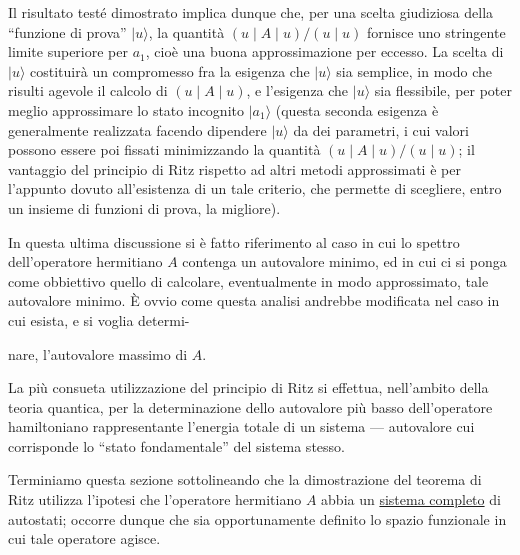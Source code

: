\documentclass[11pt, a4paper]{book}
\numberwithin{equation}{section}
\begin{document}
Il risultato testé dimostrato implica dunque che, per una scelta
giudiziosa della ``funzione di prova'' $|u\rangle$, la quantità $(u \mid A \mid u)/(u \mid u)$
fornisce uno stringente limite superiore per $a_1$, cioè una buona approssimazione per eccesso. La scelta di $|u\rangle$ costituirà un compromesso
fra la esigenza che $|u\rangle$ sia semplice, in modo che risulti agevole
il calcolo di $(u \mid A \mid u)$, e l'esigenza che $|u\rangle$ sia flessibile,
per poter meglio approssimare lo stato incognito $|a_1\rangle$ (questa seconda
esigenza è generalmente realizzata facendo dipendere $|u\rangle$ da dei parametri, i cui valori possono essere poi fissati minimizzando la quantità
$(u \mid A \mid u) / (u \mid u)$; il vantaggio del principio di Ritz rispetto ad
altri metodi approssimati è per l'appunto dovuto all'esistenza di un tale
criterio, che permette di scegliere, entro un insieme di funzioni di prova,
la migliore).

In questa ultima discussione si è fatto riferimento al caso in cui
lo spettro dell'operatore hermitiano $A$ contenga un autovalore minimo,
ed in cui ci si ponga come obbiettivo quello di calcolare, eventualmente
in modo approssimato, tale autovalore minimo. È ovvio come questa
analisi andrebbe modificata nel caso in cui esista, e si voglia determi-


nare, l'autovalore massimo di $A$.

La più consueta utilizzazione del principio di Ritz si effettua, nell'ambito della teoria quantica, per la determinazione dello
autovalore più basso dell'operatore hamiltoniano rappresentante l'energia totale di un sistema --- autovalore cui corrisponde lo ``stato fondamentale'' del sistema stesso.

Terminiamo questa sezione sottolineando che la dimostrazione
del teorema di Ritz utilizza l'ipotesi che l'operatore hermitiano $A$ abbia
un \uline{sistema completo} di autostati; occorre dunque che sia opportunamente definito lo spazio funzionale in cui tale operatore agisce.
\end{document}
